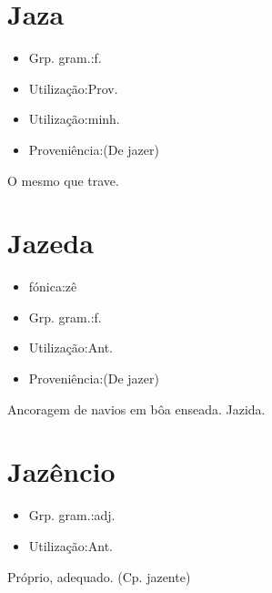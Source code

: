 \documentclass{article}
\begin{document}
\section{Jaza}
\begin{itemize}
\item {Grp. gram.:f.}
\end{itemize}
\begin{itemize}
\item {Utilização:Prov.}
\end{itemize}
\begin{itemize}
\item {Utilização:minh.}
\end{itemize}
\begin{itemize}
\item {Proveniência:(De \textunderscore jazer\textunderscore )}
\end{itemize}
O mesmo que \textunderscore trave\textunderscore .
\section{Jazeda}
\begin{itemize}
\item {fónica:zê}
\end{itemize}
\begin{itemize}
\item {Grp. gram.:f.}
\end{itemize}
\begin{itemize}
\item {Utilização:Ant.}
\end{itemize}
\begin{itemize}
\item {Proveniência:(De \textunderscore jazer\textunderscore )}
\end{itemize}
Ancoragem de navios em bôa enseada.
Jazida.
\section{Jazêncio}
\begin{itemize}
\item {Grp. gram.:adj.}
\end{itemize}
\begin{itemize}
\item {Utilização:Ant.}
\end{itemize}
Próprio, adequado.
(Cp. \textunderscore jazente\textunderscore )
\end{document}
